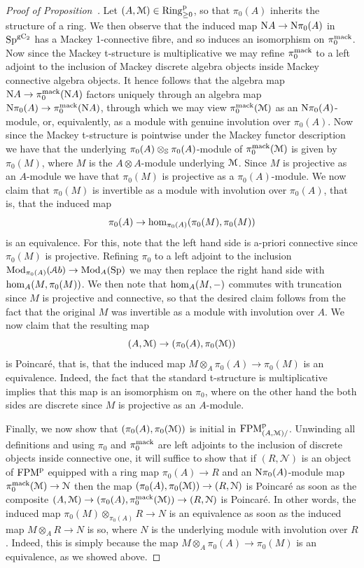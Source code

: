  
\begin{proof}[Proof of Proposition~]
Let $(A,\mathcal{M}) \in \mathrm{Ring}^{\mathrm{p}}_{\geq 0}$, so that $\pi_0(A)$ inherits the structure of a ring. We then observe that the induced map $\mathrm{N} A \to \mathrm{N}\pi_0(A)$ in $\mathrm{Sp}^{{\mathrm{g}\mathrm{C_2}}}$ has a Mackey 1-connective fibre, and so induces an isomorphism on $\pi_0^{\mathrm{mack}}$. Now since the Mackey t-structure is multiplicative we may refine $\pi_0^{\mathrm{mack}}$ to a left adjoint to the inclusion of Mackey discrete algebra objects inside Mackey connective algebra objects. It hence follows that the algebra map $\mathrm{N} A \to \pi_0^{\mathrm{mack}}(\mathrm{N} A)$ factors uniquely through an algebra map $\mathrm{N}\pi_0(A) \to \pi^{\mathrm{mack}}_0(\mathrm{N} A)$, through which we may view $\pi_0^{\mathrm{mack}}(\mathcal{M})$ as an $\mathrm{N}\pi_0(A)$-module, or, equivalently, as a module with genuine involution over $\pi_0(A)$. Now since the Mackey t-structure is pointwise under the Mackey functor description we have that the underlying $\pi_0(A)\otimes_{\mathbb{S}} \pi_0(A)$-module of $\pi_0^{\mathrm{mack}}(\mathcal{M})$ is given by $\pi_0(M)$, where $M$ is the $A \otimes A$-module underlying $\mathcal{M}$. Since $M$ is projective as an $A$-module we have that $\pi_0(M)$ is projective as a $\pi_0(A)$-module.
We now claim that $\pi_0(M)$ is invertible as a module with involution over $\pi_0(A)$, that is, that the induced map
\[
\pi_0(A) \to \operatorname{hom}_{\pi_0(A)}(\pi_0(M),\pi_0(M))
\]
is an equivalence. %
For this, note that the left hand side is a-priori connective since $\pi_0(M)$ is projective. Refining $\pi_0$ to a left adjoint to the inclusion $\operatorname{Mod}_{\pi_0(A)}(\mathcal{A}b) \to \operatorname{Mod}_{A}(\mathrm{Sp})$ we may then replace the right hand side with $\operatorname{hom}_{A}(M,\pi_0(M))$. We then note that $\operatorname{hom}_A(M,-)$ commutes with truncation since $M$ is projective and connective, so that the desired claim follows from the fact that the original $M$ was invertible as a module with involution over $A$.
We now claim that the resulting map
\[
(A,\mathcal{M}) \to (\pi_0(A),\pi_0(\mathcal{M}))
\]
is Poincaré, that is, that the induced map $M\otimes_A \pi_0(A) \to \pi_0(M)$ is an equivalence. Indeed, the fact that the standard t-structure is multiplicative implies that this map is an isomorphism on $\pi_0$, where on the other hand the both sides are discrete since $M$ is projective as an $A$-module.

Finally, we now show that $(\pi_0(A),\pi_0(\mathcal{M}))$ is initial in $\mathrm {FPM}^{\mathrm p}_{(A,\mathcal{M})/}$.  Unwinding all definitions and using $\pi_0$ and $\pi_0^{\mathrm{mack}}$ are left adjoints to the inclusion of discrete objects inside connective one, it will suffice to show that if $(R,\mathcal{N})$ is an object of $\mathrm {FPM}^{\mathrm p}$ equipped with a ring map $\pi_0(A) \to R$ and an $\mathrm{N}\pi_0(A)$-module map $\pi_0^{\mathrm{mack}}(\mathcal{M}) \to \mathcal{N}$ then the map $(\pi_0(A),\pi_0(\mathcal{M})) \to (R,\mathcal{N})$ is Poincaré as soon as the composite $(A,\mathcal{M}) \to (\pi_0(A),\pi^{\mathrm{mack}}_0(\mathcal{M})) \to (R,\mathcal{N})$ is Poincaré. In other words, the induced map $\pi_0(M)\otimes_{\pi_0(A)} R \to N$ is an equivalence as soon as the induced map $M \otimes_{A} R \to N$ is so, where $N$ is the underlying module with involution over $R$. Indeed, this is simply because the map $M\otimes_A \pi_0(A) \to \pi_0(M)$ is an equivalence, as we showed above.


\end{proof}
